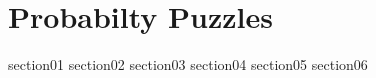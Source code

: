 \chapter{Probabilty Puzzles}

{section01}
{section02}
{section03}
{section04}
{section05}
{section06}